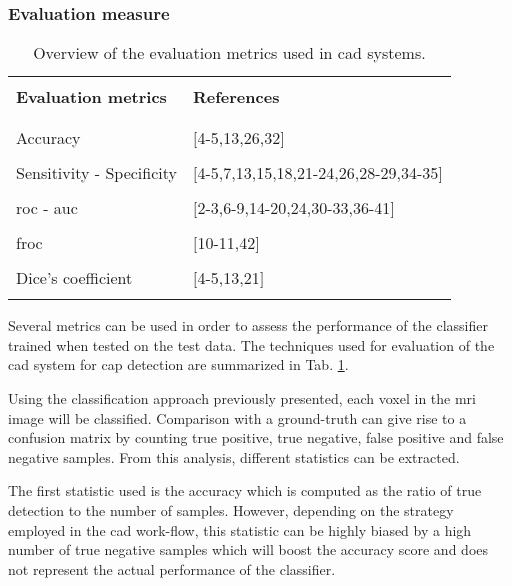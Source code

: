 \subsubsection{Evaluation measure}\label{subsubsec:eval}

\begin{table}
	\caption{Overview of the evaluation metrics used in \ac{cad} systems.}
	\small
	\renewcommand{\arraystretch}{.8}
	\begin{tabular}{p{.55\linewidth} p{.35\linewidth}}
		\hline \\ [-1.5ex]
		\textbf{Evaluation metrics} & \textbf{References} \\ \\ [-1.5ex]
		\hline \\ [-1.5ex]
		\quad Accuracy & $[$4-5,13,26,32$]$ \\ \\ [-1.5ex]
		\quad Sensitivity - Specificity & $[$4-5,7,13,15,18,21-24,26,28-29,34-35$]$ \\ \\ [-1.5ex]
		\quad \acs{roc} - \acs{auc} & $[$2-3,6-9,14-20,24,30-33,36-41$]$ \\ \\ [-1.5ex]
		\quad \acs{froc} & $[$10-11,42$]$ \\ \\ [-1.5ex]
		\quad Dice's coefficient & $[$4-5,13,21$]$ \\ \\ [-1.5ex]
		\hline
	\end{tabular}
	\label{tab:evatec}
\end{table}

Several metrics can be used in order to assess the performance of the classifier trained when tested on the test data. The techniques used for evaluation of the \ac{cad} system for \ac{cap} detection are summarized in Tab. \ref{tab:evatec}.

Using the classification approach previously presented, each voxel in the \ac{mri} image will be classified. Comparison with a ground-truth can give rise to a confusion matrix by counting true positive, true negative, false positive and false negative samples. From this analysis, different statistics can be extracted. 

The first statistic used is the accuracy which is computed as the ratio of true detection to the number of samples. However, depending on the strategy employed in the \ac{cad} work-flow, this statistic can be highly biased by a high number of true negative samples which will boost the accuracy score and does not represent the actual performance of the classifier.

